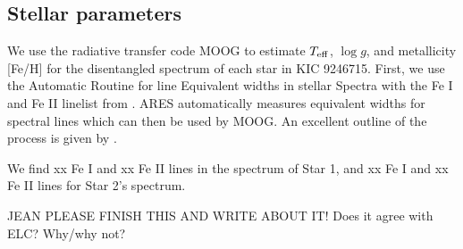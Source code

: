 \subsection{Stellar parameters}\label{parameters}
We use the radiative transfer code MOOG \citep{sne73} to estimate $T_{\rm{eff}}$, $\log g$, and metallicity [Fe/H] for the disentangled spectrum of each star in KIC 9246715. First, we use the Automatic Routine for line Equivalent widths in stellar Spectra \citep[ARES,][]{Sousa_2007} with the Fe I and Fe II linelist from \citet{Yong_2005}. ARES automatically measures equivalent widths for spectral lines which can then be used by MOOG. An excellent outline of the process is given by \citet{Sousa_2014}.

We find xx Fe I and xx Fe II lines in the spectrum of Star 1, and xx Fe I and xx Fe II lines for Star 2's spectrum. 

JEAN PLEASE FINISH THIS AND WRITE ABOUT IT! Does it agree with ELC? Why/why not?